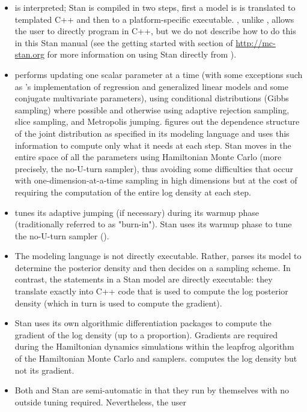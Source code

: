 \begin{itemize}
\item \BUGS is interpreted; Stan is compiled in two steps, first a
  model is is translated to templated C++ and then to a
  platform-specific executable.  \Stan, unlike \BUGS, allows the user
  to directly program in C++, but we do not describe how to do this in
  this Stan manual (see the getting started with \Cpp section of
  \url{http://mc-stan.org} for more information on using Stan directly
  from \Cpp). 
\item \BUGS performs \MCMC updating one scalar parameter at a time
  (with some exceptions such as \JAGS's implementation of regression
  and generalized linear models and some conjugate multivariate
  parameters), using conditional distributions (Gibbs sampling) where
  possible and otherwise using adaptive rejection sampling, slice
  sampling, and Metropolis jumping.  \BUGS figures out the dependence
  structure of the joint distribution as specified in its modeling
  language and uses this information to compute only what it needs at
  each step.  Stan moves in the entire space of all the parameters
  using Hamiltonian Monte Carlo (more precisely, the no-U-turn
  sampler), thus avoiding some difficulties that occur with
  one-dimension-at-a-time sampling in high dimensions but at the cost
  of requiring the computation of the entire log density at each step.
\item \BUGS tunes its adaptive jumping (if necessary) during its
  warmup phase (traditionally referred to as "burn-in").  Stan uses
  its warmup phase to tune the no-U-turn sampler (\NUTS).
\item The \BUGS modeling language is not directly executable.  Rather,
  \BUGS parses its model to determine the posterior density and then
  decides on a sampling scheme.  In contrast, the statements in a Stan
  model are directly executable: they translate exactly into C++ code
  that is used to compute the log posterior density (which in turn is
  used to compute the gradient).
\item Stan uses its own \Cpp algorithmic differentiation packages to
  compute the gradient of the log density (up to a proportion).
  Gradients are required during the Hamiltonian dynamics simulations
  within the leapfrog algorithm of the Hamiltonian Monte Carlo and
  \NUTS samplers.  \BUGS computes the log density but not its
  gradient.
\item Both \BUGS and Stan are semi-automatic in that they run by
  themselves with no outside tuning required. Nevertheless, the user

\end{itemize}
